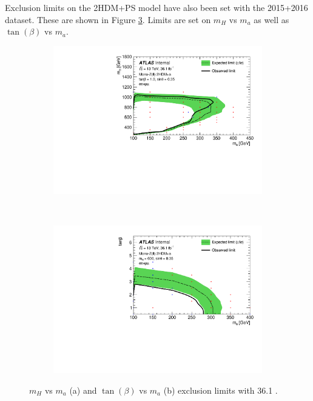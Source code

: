 Exclusion limits on the 2HDM+PS model have also been set with the 2015+2016 dataset. These are shown in Figure \ref{fig:2hdma}. Limits are set on $m_H$ vs $m_a$ as well as $\tan(\beta)$ vs $m_a$.

\begin{figure}[htb]
    \centering
    \begin{subfigure}[b]{0.48\textwidth}
        \includegraphics[width=\textwidth]{Figures/limits_2hdma.pdf}
        \label{fig:limits_2hdma}
    \end{subfigure}
    ~ %
    \begin{subfigure}[b]{0.48\textwidth}
        \includegraphics[width=\textwidth]{Figures/limits_2hdma_tan.pdf}
        \label{fig:limits_2hdma_tan}
    \end{subfigure}
    \caption{$m_H$ vs $m_a$ (a) and $\tan(\beta)$ vs $m_a$ (b) exclusion limits with 36.1 \ifb.}
\label{fig:2hdma}
\end{figure}

